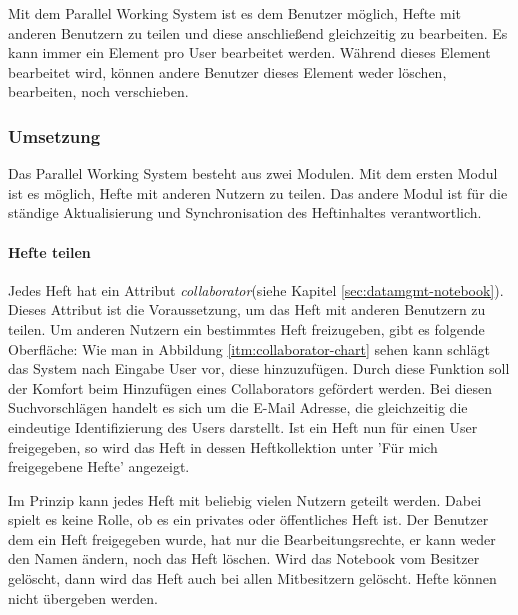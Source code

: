 Mit dem Parallel Working System ist es dem Benutzer möglich, Hefte mit anderen Benutzern zu teilen und diese anschließend gleichzeitig zu bearbeiten. Es kann immer ein Element pro User bearbeitet werden. Während dieses Element bearbeitet wird, können andere Benutzer dieses Element weder löschen, bearbeiten, noch verschieben. 

\subsubsection{Umsetzung}
Das Parallel Working System besteht aus zwei Modulen. Mit dem ersten Modul ist es möglich, Hefte mit anderen Nutzern zu teilen. Das andere Modul ist für die ständige Aktualisierung und Synchronisation des Heftinhaltes verantwortlich. 
\paragraph{Hefte teilen}
Jedes Heft hat ein Attribut \textit{collaborator}(siehe Kapitel \ref{sec:datamgmt-notebook}). Dieses Attribut ist die Voraussetzung, um das Heft mit anderen Benutzern zu teilen. 
Um anderen Nutzern ein bestimmtes Heft freizugeben, gibt es folgende Oberfläche:
Wie man in Abbildung \ref{itm:collaborator-chart} sehen kann schlägt das System nach Eingabe User vor, diese hinzuzufügen. Durch diese Funktion soll der Komfort beim Hinzufügen eines Collaborators gefördert werden. Bei diesen Suchvorschlägen handelt es sich um die E-Mail Adresse, die gleichzeitig die eindeutige Identifizierung des Users darstellt.
Ist ein Heft nun für einen User freigegeben, so wird das Heft in dessen Heftkollektion unter 'Für mich freigegebene Hefte' angezeigt. 


\newpage

Im Prinzip kann jedes Heft mit beliebig vielen Nutzern geteilt werden. Dabei spielt es keine Rolle, ob es ein privates oder öffentliches Heft ist. 
Der Benutzer dem ein Heft freigegeben wurde, hat nur die Bearbeitungsrechte, er kann weder den Namen ändern, noch das Heft löschen. Wird das Notebook vom Besitzer gelöscht, dann wird das Heft auch bei allen Mitbesitzern gelöscht. Hefte können nicht übergeben werden.

